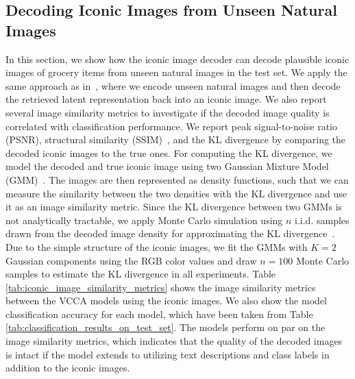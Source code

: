 

\subsection{Decoding Iconic Images from Unseen Natural Images}
\label{paperB:sec:decoding_iconic_images} 

In this section, we show how the iconic image decoder can decode plausible iconic images of grocery items from unseen natural images in the test set. We apply the same approach as in~, where we encode unseen natural images and then decode the retrieved latent representation back into an iconic image. We also report several image similarity metrics to investigate if the decoded image quality is correlated with classification performance.
We report peak signal-to-noise ratio (PSNR), structural similarity (SSIM)~, and the KL divergence by comparing the decoded iconic images to the true ones. For computing the KL divergence, we model the decoded and true iconic image using two Gaussian Mixture Model (GMM)~. The images are then represented as density functions, such that we can measure the similarity between the two densities with the KL divergence and use it as an image similarity metric. Since the KL divergence between two GMMs is not analytically tractable, we apply Monte Carlo simulation using $n$ i.i.d. samples drawn from the decoded image density for approximating the KL divergence~. 
Due to the simple structure of the iconic images, we fit the GMMs with $K=2$ Gaussian components using the RGB color values and draw $n=100$ Monte Carlo samples to estimate the KL divergence in all experiments. 
Table \ref{tab:iconic_image_similarity_metrics} shows the image similarity metrics between the VCCA models using the iconic images. We also show the model classification accuracy for each model, which have been taken from Table \ref{tab:classification_results_on_test_set}. 
The models perform on par on the image similarity metrics, which indicates that the quality of the decoded images is intact if the model extends to utilizing text descriptions and class labels in addition to the iconic images.

